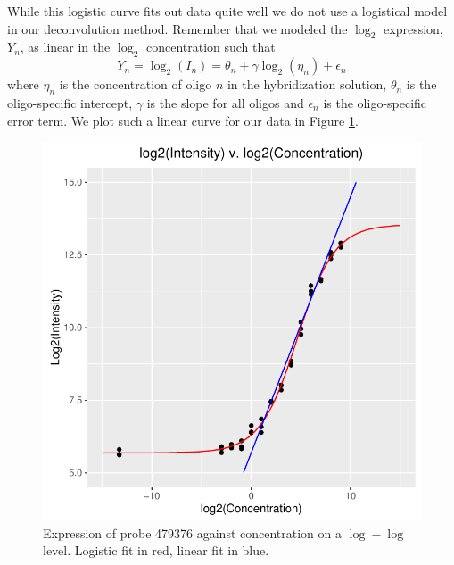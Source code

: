 \documentclass[reqno,12pt,oneside]{report}\usepackage[]{graphicx}\usepackage[]{color}
\makeatletter
\def\maxwidth{ %
  \ifdim\Gin@nat@width>\linewidth
    \linewidth
  \else
    \Gin@nat@width
  \fi
}
\newenvironment{knitrout}{}{} %
\renewenvironment{knitrout}{\begin{small}}{\end{small}}
\theoremstyle{plain}
\theoremstyle{definition}
\theoremstyle{remark}
\numberwithin{theorem}{chapter}     %
\makeatother
\begin{document}
While this logistic curve fits out data quite well we do not use a logistical model in our deconvolution method. Remember that we modeled the $\log_2$ expression, $Y_n$, as linear in the $\log_2$ concentration such that 
\[
Y_n =\log_2(I_n) = \theta_n + \gamma\log_2\left(\eta_n\right) + \epsilon_n
\]
where $\eta_n$ is the concentration of oligo $n$ in the hybridization solution, $\theta_n$ is the oligo-specific intercept, $\gamma$ is the slope for all oligos and $\epsilon_n$ is the oligo-specific error term. We plot such a linear curve for our data in Figure \ref{fig:c3}.

\begin{figure}[ht]
  \centering
\begin{knitrout}
\color{fgcolor}
\includegraphics[width=\maxwidth]{figure/chap4-fig3-1} 

\end{knitrout}
\caption{Expression of probe 479376 against concentration on a $\log-\log$ level. Logistic fit in red, linear fit in blue.}
  \label{fig:c3}
\end{figure}  
\end{document}
